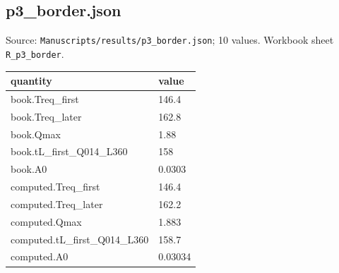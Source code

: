 \subsection*{p3\_border.json}
\noindent\small Source: \nolinkurl{Manuscripts/results/p3_border.json}; 10 values. Workbook sheet \texttt{R\_p3\_border}.\par
{\scriptsize\begin{longtable}{p{}p{}}\toprule\textbf{quantity} & \textbf{value}\\\midrule\endhead
{}book.Treq\_first & 146.4\\
{}book.Treq\_later & 162.8\\
{}book.Qmax & 1.88\\
{}book.tL\_first\_Q014\_L360 & 158\\
{}book.A0 & 0.0303\\
{}computed.Treq\_first & 146.4\\
{}computed.Treq\_later & 162.2\\
{}computed.Qmax & 1.883\\
{}computed.tL\_first\_Q014\_L360 & 158.7\\
{}computed.A0 & 0.03034\\
\bottomrule\end{longtable}}

